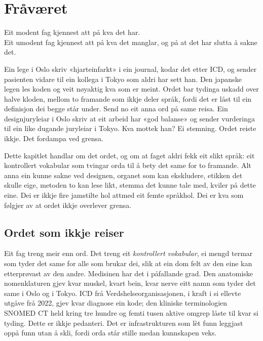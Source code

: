 \chapter{Fråværet}

\begin{motto}
Eit modent fag kjennest att på kva det har.\\ Eit umodent fag kjennest att på kva det manglar, og på at det har slutta å sakne det.
\end{motto}

Ein lege i Oslo skriv «hjarteinfarkt» i ein journal, kodar det etter ICD, og sender pasienten vidare til ein kollega i Tokyo som aldri har sett han. Den japanske legen les koden og veit nøyaktig kva som er meint. Ordet bar tydinga uskadd over halve kloden, mellom to framande som ikkje deler språk, fordi det er låst til ein definisjon dei begge står under. Send no eit anna ord på same reisa. Ein designjuryleiar i Oslo skriv at eit arbeid har «god balanse» og sender vurderinga til ein like dugande juryleiar i Tokyo. Kva mottek han? Ei stemning. Ordet reiste ikkje. Det fordampa ved grensa.

Dette kapitlet handlar om det ordet, og om at faget aldri fekk eit slikt språk: eit kontrollert vokabular som tvingar orda til å bety det same for to framande. Alt anna ein kunne sakne ved designen, organet som kan ekskludere, etikken det skulle eige, metoden to kan lese likt, stemma det kunne tale med, kviler på dette eine. Dei er ikkje fire jamstilte hol attmed eit femte språkhol. Dei er kva som følgjer av at ordet ikkje overlever grensa.


\section{Ordet som ikkje reiser}

Eit fag treng meir enn ord. Det treng eit \emph{kontrollert vokabular}, ei mengd termar som tyder det same for alle som brukar dei, slik at ein dom felt av den eine kan etterprøvast av den andre. Medisinen har det i påfallande grad. Den anatomiske nomenklaturen gjev kvar muskel, kvart bein, kvar nerve eitt namn som tyder det same i Oslo og i Tokyo. ICD frå Verdshelseorganisasjonen, i kraft i si ellevte utgåve frå 2022, gjev kvar diagnose ein kode; den kliniske terminologien SNOMED CT held kring tre hundre og femti tusen aktive omgrep låste til kvar si tyding. Dette er ikkje pedanteri. Det er infrastrukturen som lèt funn leggjast oppå funn utan å skli, fordi orda står stille medan kunnskapen veks.

